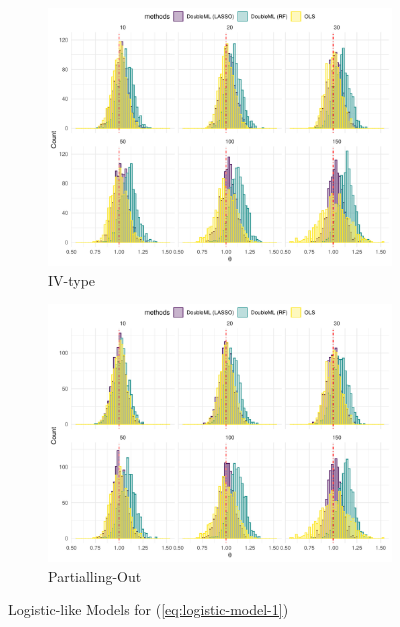 \documentclass[en,12pt,mtpro2]{elegantpaper}
\begin{document}
\begin{figure}[htp]
    \centering
    \begin{subfigure}{.41\textwidth}
        \centering
        \includegraphics[width=\linewidth]{figures/simulation-logistic3 (IV-type).pdf}
        \caption{IV-type}
    \end{subfigure}
    \begin{subfigure}{.41\textwidth}
        \centering
        \includegraphics[width=\linewidth]{figures/simulation-logistic3 (partialling out).pdf}
        \caption{Partialling-Out}
    \end{subfigure}
    \caption{Logistic-like Models for (\ref{eq:logistic-model-1})}
\end{figure}
\end{document}
